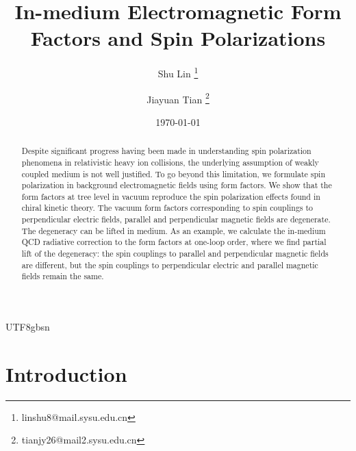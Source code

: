 \documentclass[11pt]{article}\def\baselinestretch{1.4}
\date{\today}
\begin{document}
\begin{CJK}{UTF8}{gbsn}

\title{\bf In-medium Electromagnetic Form Factors and Spin Polarizations}

\author[1]{{Shu Lin}
\thanks{linshu8@mail.sysu.edu.cn}}
\author[1]{{Jiayuan Tian}
\thanks{tianjy26@mail2.sysu.edu.cn}}

\maketitle


\begin{abstract}

Despite significant progress having been made in understanding spin polarization phenomena in relativistic heavy ion collisions, the underlying assumption of weakly coupled medium is not well justified. To go beyond this limitation, we formulate spin polarization in background electromagnetic fields using form factors. We show that the form factors at tree level in vacuum reproduce the spin polarization effects found in chiral kinetic theory. The vacuum form factors corresponding to spin couplings to perpendicular electric fields, parallel and perpendicular magnetic fields are degenerate. The degeneracy can be lifted in medium. As an example, we calculate the in-medium QCD radiative correction to the form factors at one-loop order, where we find partial lift of the degeneracy: the spin couplings to parallel and perpendicular magnetic fields are different, but the spin couplings to perpendicular electric and parallel magnetic fields remain the same. 
\end{abstract}


\newpage

\section{Introduction}


\end{CJK}
\end{document}
